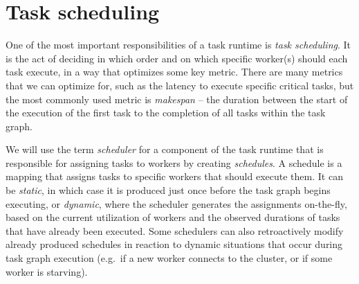 \section{Task scheduling}
One of the most important responsibilities of a task runtime is \emph{task scheduling}. It is the
act of deciding in which order and on which specific worker(s) should each task execute, in a way
that optimizes some key metric. There are many metrics that we can optimize for, such as the
latency to execute specific critical tasks, but the most commonly used metric is
\emph{makespan} -- the duration between the start of the execution of the first task to the
completion of all tasks within the task graph.


We will use the term \emph{scheduler} for a component of the task runtime that is responsible
for assigning tasks to workers by creating \emph{schedules}. A schedule is a mapping that
assigns tasks to specific workers that should execute them. It can be \emph{static}, in
which case it is produced just once before the task graph begins executing, or
\emph{dynamic}, where the scheduler generates the assignments on-the-fly, based on the
current utilization of workers and the observed durations of tasks that have already been executed.
Some schedulers can also retroactively modify already produced schedules in reaction to dynamic
situations that occur during task graph execution (e.g.\ if a new worker connects to the cluster,
or if some worker is starving).

